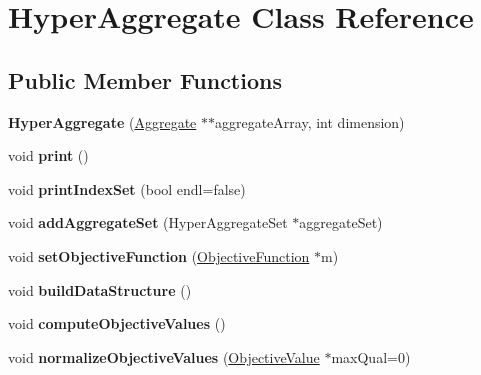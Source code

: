 \hypertarget{classHyperAggregate}{\section{Hyper\-Aggregate Class Reference}
\label{classHyperAggregate}
}
\subsection*{Public Member Functions}
\begin{DoxyCompactItemize}
\item 
\hypertarget{classHyperAggregate_a07b89e7c22ffeb5021707f1c3ef821f6}{{\bfseries Hyper\-Aggregate} (\hyperlink{classAggregate}{Aggregate} $\ast$$\ast$aggregate\-Array, int dimension)}\label{classHyperAggregate_a07b89e7c22ffeb5021707f1c3ef821f6}

\item 
\hypertarget{classHyperAggregate_a189540a613a9a27c4c458a3b0febf974}{void {\bfseries print} ()}\label{classHyperAggregate_a189540a613a9a27c4c458a3b0febf974}

\item 
\hypertarget{classHyperAggregate_ad01f17867baea2abe0d2d51407d604ac}{void {\bfseries print\-Index\-Set} (bool endl=false)}\label{classHyperAggregate_ad01f17867baea2abe0d2d51407d604ac}

\item 
\hypertarget{classHyperAggregate_a8e03ce6d7669702d6b78e4ef5b7a1b64}{void {\bfseries add\-Aggregate\-Set} (Hyper\-Aggregate\-Set $\ast$aggregate\-Set)}\label{classHyperAggregate_a8e03ce6d7669702d6b78e4ef5b7a1b64}

\item 
\hypertarget{classHyperAggregate_a457a4455a692bd49510937281634f649}{void {\bfseries set\-Objective\-Function} (\hyperlink{classObjectiveFunction}{Objective\-Function} $\ast$m)}\label{classHyperAggregate_a457a4455a692bd49510937281634f649}

\item 
\hypertarget{classHyperAggregate_ade2f5042664cd52a541fb7e1cf516d19}{void {\bfseries build\-Data\-Structure} ()}\label{classHyperAggregate_ade2f5042664cd52a541fb7e1cf516d19}

\item 
\hypertarget{classHyperAggregate_a82f62a9329d38b8636aad039e528599c}{void {\bfseries compute\-Objective\-Values} ()}\label{classHyperAggregate_a82f62a9329d38b8636aad039e528599c}

\item 
\hypertarget{classHyperAggregate_acf16618e534c7df803894d8961e0832a}{void {\bfseries normalize\-Objective\-Values} (\hyperlink{classObjectiveValue}{Objective\-Value} $\ast$max\-Qual=0)}\label{classHyperAggregate_acf16618e534c7df803894d8961e0832a}


\end{DoxyCompactItemize}
